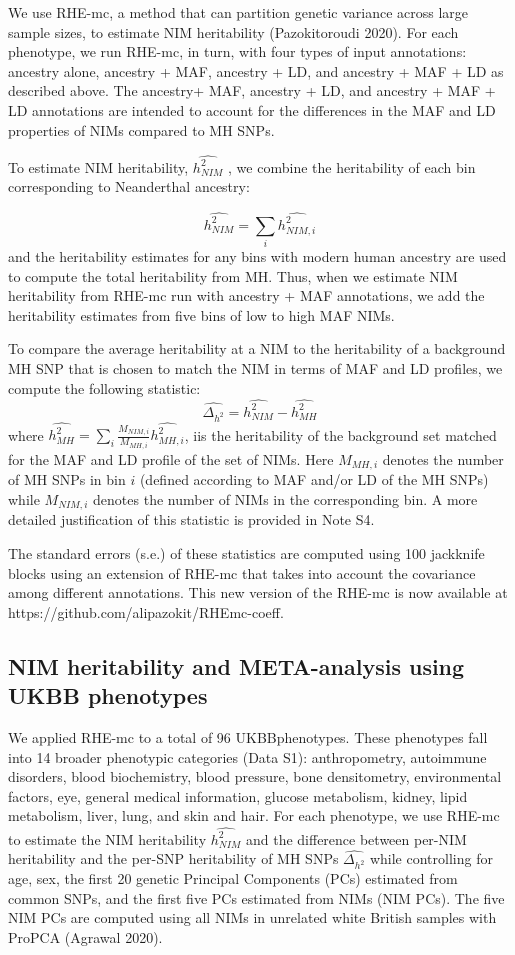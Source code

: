 We use RHE-mc, a method that can partition genetic variance across large sample sizes, to estimate NIM heritability (Pazokitoroudi 2020). For each phenotype, we run RHE-mc, in turn, with four types of input annotations: ancestry alone, ancestry + MAF, ancestry + LD, and ancestry + MAF + LD as described above. The ancestry+ MAF, ancestry + LD, and ancestry + MAF + LD annotations are intended to account for the differences in the MAF and LD properties of NIMs compared to MH SNPs.

To estimate NIM heritability, $\hat{h^2_{NIM}}$ , we combine the heritability of each bin corresponding to Neanderthal ancestry:

$$\hat{h^2_{NIM}} = \sum_i \hat{h^2_{NIM,i}}$$
and the heritability estimates for any bins with modern human ancestry are used to compute the total heritability from MH. Thus, when we estimate NIM heritability from RHE-mc run with ancestry + MAF annotations, we add the heritability estimates from five bins of low to high MAF NIMs.
 
To compare the average heritability at a NIM to the heritability of a background MH SNP that is chosen to match the NIM in terms of MAF and LD profiles, we compute the following statistic:
$$\hat{\Delta_{h^2}}=\hat{h^2_{NIM}}-\hat{h^2_{MH}}$$
where $\hat{h^2_{MH}} = \sum_i \frac{M_{NIM,i}}{M_{MH,i}} \hat{h^2_{MH,i}}$, iis the heritability of the background set matched for the MAF and LD profile of the set of NIMs. Here $M_{MH,i}$ denotes the number of MH SNPs in bin $i$  (defined according to MAF and/or LD of the MH SNPs) while $M_{NIM,i}$ denotes the number of NIMs in the corresponding bin. A more detailed justification of this statistic is provided in Note S4.

The standard errors (s.e.) of these statistics are computed using 100 jackknife blocks using an extension of RHE-mc that takes into account the covariance among different annotations. This new version of the RHE-mc is now available at https://github.com/alipazokit/RHEmc-coeff. 

\subsection{NIM heritability and META-analysis using UKBB phenotypes}
We applied RHE-mc to a total of 96 UKBBphenotypes. These phenotypes fall into 14 broader phenotypic categories (Data S1): anthropometry, autoimmune disorders, blood biochemistry, blood pressure, bone densitometry, environmental factors, eye, general medical information, glucose metabolism, kidney, lipid metabolism, liver, lung, and skin and hair. For each phenotype, we use RHE-mc to estimate the NIM heritability $\hat{h^2_{NIM}}$ and the difference between per-NIM heritability and the per-SNP heritability of MH SNPs $\hat{\Delta_{h^2}}$ while controlling for age, sex, the first 20 genetic Principal Components (PCs) estimated from common SNPs, and the first five PCs estimated from NIMs (NIM PCs). The five NIM PCs are computed using all NIMs in unrelated white British samples with ProPCA (Agrawal 2020). 

